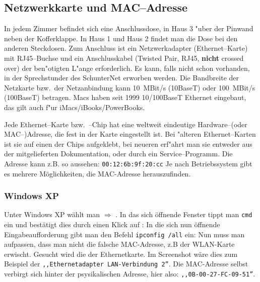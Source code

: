 
\subsection{Netzwerkkarte und MAC--Adresse}
\label{sec:netzw-und-mac}
In jedem Zimmer befindet sich eine Anschlussdose, in Haus 3 "uber der Pinwand
neben der Kofferklappe. In Haus 1 und Haus 2 findet man die Dose bei
den anderen Steckdosen. 
\rm Zum Anschluss ist ein Netzwerkadapter (Ethernet--Karte) mit RJ45--Buch\-se und
ein Anschlusskabel (Twisted Pair, RJ45, \textbf{nicht} crossed over) der
ben"otigten L"ange erforderlich. Es  kann, falls nicht schon
vorhanden, in der \glossar Sprechstunder des SchunterNet erworben werden.
Die Bandbreite der Netzkarte bzw.\  der Netzanbindung kann 10~MBit/s (10BaseT) oder 100~MBit/s (100BaseT) betragen. Macs haben seit 1999 10/100BaseT Ethernet eingebaut, das gilt auch
f"ur iMacs/iBooks/PowerBooks.

Jede Ethernet--Karte bzw.\ --Chip hat eine weltweit eindeutige Hardware--(oder
\glossar MAC--)Adresse, die fest in der Karte eingestellt ist. Bei "alteren
Ethernet--Karten ist sie auf einen der Chips aufgeklebt, bei neueren
erf"ahrt man sie entweder aus der mitgelieferten Dokumentation, oder
durch ein Service--Programm.%
Die Adresse kann z.B. so aussehen: \texttt{00:12:6b:9f:20:cc}
Je nach Betriebssystem gibt es mehrere Möglichkeiten, die MAC-Adresse
herauszufinden.
\newpage
\subsubsection*{Windows XP}

Unter Windows XP wählt man  $\Rightarrow$
.  In das sich öffnende Fenster tippt man  \texttt{cmd}
ein und bestätigt dies durch einen Klick auf :
 In die sich
nun öffnende Eingabeaufforderung gibt man den Befehl \texttt{ipconfig /all}
ein: %
Nun muss man aufpassen, dass man nicht die falsche MAC-Adresse, z.B
der WLAN-Karte erwischt. Gesucht wird die der Ethernetkarte. Im
Screenshot wäre dies zum Beispiel der \texttt{,,Ethernetadapter LAN-Verbindung
2''}. Die MAC-Adresse selbst verbirgt sich hinter der psysikalischen
Adresse, hier also: \texttt{,,0B-00-27-FC-09-51''}.
